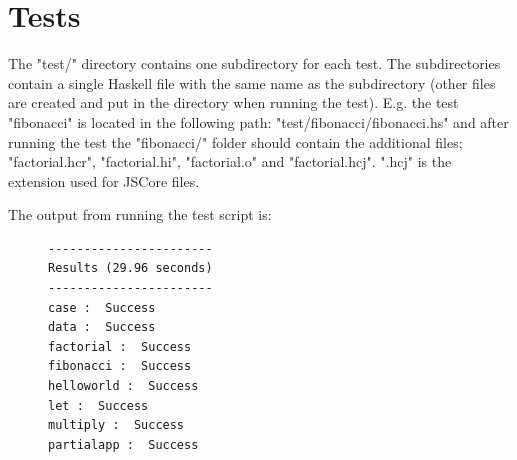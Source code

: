 \section{Tests}

The "test/" directory contains one subdirectory for each test. The
subdirectories contain a single Haskell file with the same name as the
subdirectory (other files are created and put in the directory when running
the test). E.g. the test "fibonacci" is located in the following path:
"test/fibonacci/fibonacci.hs" and after running the test the "fibonacci/"
folder should contain the additional files; "factorial.hcr", "factorial.hi",
"factorial.o" and "factorial.hcj". ".hcj" is the extension used for JSCore
files.

The output from running the test script is:

\begin{figure}[H]
\lstset{ %
language=Python,
caption=Output from running the test script,
label=lst:testoutput
}
\begin{lstlisting}
-----------------------
Results (29.96 seconds)
-----------------------
case :  Success
data :  Success
factorial :  Success
fibonacci :  Success
helloworld :  Success
let :  Success
multiply :  Success
partialapp :  Success
\end{lstlisting}
\end{figure}

